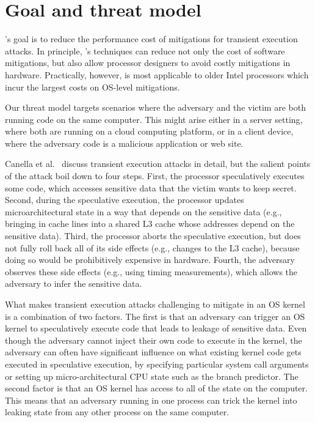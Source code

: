 \section{Goal and threat model}

\sys's goal is to reduce the performance cost of mitigations for transient
execution attacks.  In principle, \sys's techniques can reduce not only
the cost of software mitigations, but also allow processor designers
to avoid costly mitigations in hardware.  Practically, however, \sys 
is most applicable to older Intel processors which incur the largest
costs on OS-level mitigations.


Our threat model targets scenarios where the adversary
and the victim are both running code on the same computer.  This might
arise either in a server setting, where both are running on a cloud
computing platform, or in a client device, where the adversary code is
a malicious application or web site.

Canella et al.~\cite{sok:transient} discuss transient execution attacks
in detail, but the salient points of the attack boil down to four steps.
First, the processor speculatively executes some code, which accesses
sensitive data that the victim wants to keep secret.  Second, during the
speculative execution, the processor updates microarchitectural state
in a way that depends on the sensitive data (e.g., bringing in cache
lines into a shared L3 cache whose addresses depend on the sensitive
data).  Third, the processor aborts the speculative execution, but does
not fully roll back all of its side effects (e.g., changes to the L3
cache), because doing so would be prohibitively expensive in hardware.
Fourth, the adversary observes these side effects (e.g., using timing
measurements), which allows the adversary to infer the sensitive data.

What makes transient execution attacks challenging to mitigate in an
OS kernel is a combination of two factors.  The first is that an
adversary can trigger an OS kernel to speculatively execute code that
leads to leakage of sensitive data.  Even though the adversary cannot
inject their own code to execute in the kernel, the adversary can often
have significant influence on what existing kernel code gets executed in
speculative execution, by specifying particular system call arguments or
setting up micro-architectural CPU state such as the branch predictor.
The second factor is that an OS kernel has access to all of the state
on the computer.  This means that an adversary running in one process
can trick the kernel into leaking state from any other process on the
same computer.

